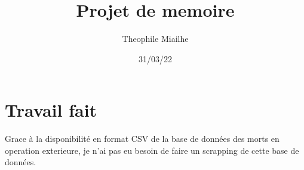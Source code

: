 \documentclass[12pt]{article}
\title{Projet de memoire}
\author{Theophile Miailhe}
\date{31/03/22}
\begin{document}
\maketitle

\section{Travail fait}
	Grace à la disponibilité en format CSV de la base de données des morts en operation exterieure, je n'ai pas eu besoin de faire un scrapping de cette base de données. 
\end{document}
